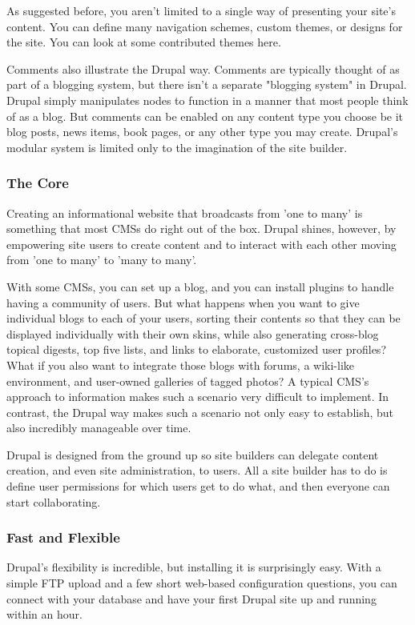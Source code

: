 As suggested before, you aren't limited to a single way of presenting your site's content. You can define many navigation schemes, custom themes, or designs for the site. You can look at some contributed themes here.

Comments also illustrate the Drupal way. Comments are typically thought of as part of a blogging system, but there isn't a separate "blogging system" in Drupal. Drupal simply manipulates nodes to function in a manner that most people think of as a blog. But comments can be enabled on any content type you choose be it blog posts, news items, book pages, or any other type you may create. Drupal's modular system is limited only to the imagination of the site builder.

\subsubsection{The Core}

Creating an informational website that broadcasts from 'one to many' is something that most CMSs do right out of the box. Drupal shines, however, by empowering site users to create content and to interact with each other moving from 'one to many' to 'many to many'.

With some CMSs, you can set up a blog, and you can install plugins to handle having a community of users. But what happens when you want to give individual blogs to each of your users, sorting their contents so that they can be displayed individually with their own skins, while also generating cross-blog topical digests, top five lists, and links to elaborate, customized user profiles? What if you also want to integrate those blogs with forums, a wiki-like environment, and user-owned galleries of tagged photos? A typical CMS's approach to information makes such a scenario very difficult to implement. In contrast, the Drupal way makes such a scenario not only easy to establish, but also incredibly manageable over time.

Drupal is designed from the ground up so site builders can delegate content creation, and even site administration, to users. All a site builder has to do is define user permissions for which users get to do what, and then everyone can start collaborating.


\subsubsection{Fast and Flexible}
Drupal's flexibility is incredible, but installing it is surprisingly easy. With a simple FTP upload and a few short web-based configuration questions, you can connect with your database and have your first Drupal site up and running within an hour.

